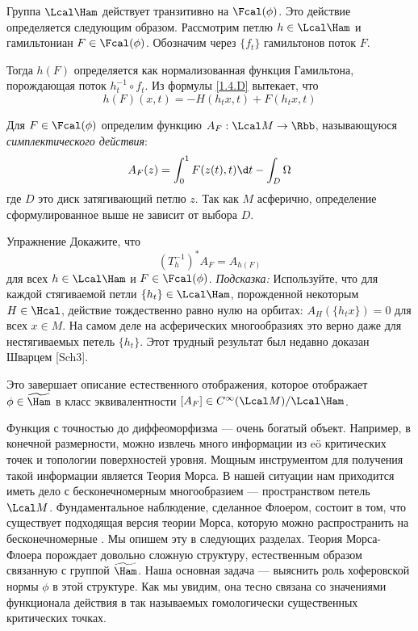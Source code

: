 Группа $\Lcal\Ham$ действует транзитивно на $\Fcal(\phi)$. Это
действие определяется следующим образом. Рассмотрим петлю $h\in\Lcal\Ham$ и
гамильтониан $F\in\Fcal(\phi)$. Обозначим через $\{f_{t}\}$
гамильтонов поток $F$.

Тогда $h(F)$ определяется как нормализованная функция Гамильтона, порождающая поток
$h^{-1}_{t}\circ f_{t}$. Из формулы \ref{1.4.D} вытекает, что
\[
h(F)(x,t) = -H(h_{t}x,t) + F(h_{t}x,t)
\]

Для $F\in\Fcal(\phi)$ определим функцию $A_{F}:\Lcal M\to\Rbb$,
называющуюся {\em {} симплектического действия}:
\[
A_{F}(z)=\int_{0}^{1}F(z(t),t)\d t - \int_{D}\Omega
\]
где $D$ это диск затягивающий петлю $z$. Так как $M$ асферично,
определение сформулированное выше не зависит от выбора $D$.

\begin{ex}{Упражнение}\label{13.1.A}
  Докажите, что
  \[
  (T_{h}^{-1})^{*}A_{F}= A _{h(F)}
  \]
  для всех $h\in\Lcal\Ham$ и $F\in\Fcal(\phi)$. {\em Подсказка:}
  Используйте, что для каждой стягиваемой петли
  $\{h_{t}\}\in\Lcal\Ham$, порожденной некоторым $H\in\Hcal$, действие
  тождественно равно нулю на орбитах: $A_{H}(\{h_{t}x\}) = 0$ для всех
  $x\in M$.
  На самом деле на асферических многообразиях это верно даже для
  нестягиваемых петель $\{h_{t}\}$.
  Этот трудный результат был недавно доказан Шварцем [Sch3].
\end{ex}
Это завершает описание естественного отображения, которое отображает
$\phi\in\widetilde\Ham$ в
класс эквивалентности $[A_{F}]\in C^{\infty} (\Lcal M)/\Lcal\Ham$.

Функция с точностью до диффеоморфизма — очень богатый объект. Например, в
конечной размерности, можно извлечь много информации из eö критических
точек  и топологии поверхностей уровня.
Мощным инструментом для получения такой информации является
Теория Морса. В нашей ситуации нам приходится иметь дело с бесконечномерным
многообразием --- пространством петель $\Lcal M$.
Фундаментальное наблюдение, сделанное Флоером, состоит в том,
что существует подходящая версия теории Морса, которую можно распространить на
бесконечномерные .
Мы опишем эту  в следующих разделах. Теория
Морса-Флоера порождает довольно сложную структуру, естественным образом связанную 
с группой $\widetilde\Ham$. Наша основная задача --- выяснить роль
хоферовской нормы $\phi$ в этой структуре.
Как мы увидим, она тесно связана со значениями функционала действия
в так называемых гомологически существенных критических точках. 

